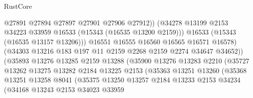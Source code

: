 \begin{lexlean}{RustCore}
\begin{coremodule}
                                        @27891
                                        @27894
                                        @27897
                                        @27901
                                        @27906
                                        @27912))
                                    (@34278
                                      @13199
                                      @2153
                                      @34223
                                      @33959
                                      @16533
                                      (@15343 (@16535 @13200 @2159)))
                                    @16533
                                    (@15343 (@16535 @13157 @13206)))
                                  @16551
                                  @16555
                                  @16560
                                  @16565
                                  @16571
                                  @16578)
                                (@34303 @13216 @183 @197 @11 @2159 @2268 @2159 @2274 @34647 @34652))
                              (@35893
                                @13276
                                @13285
                                @2159
                                @13288
                                (@35900
                                  @13276
                                  @13283
                                  @2210
                                  (@35727
                                    @13262
                                    @13275
                                    @13282
                                    @2184
                                    @13225
                                    @2153
                                    (@35363
                                      @13251
                                      @13260
                                      (@35368
                                        @13251
                                        @13258
                                        @8041
                                        (@35375
                                          @13250
                                          @13257
                                          @2184
                                          @13233
                                          @2153
                                          @34234
                                          (@34168
                                            @13243
                                            @2153
                                            @34023
                                            @33959

\end{coremodule}
\end{lexlean}
